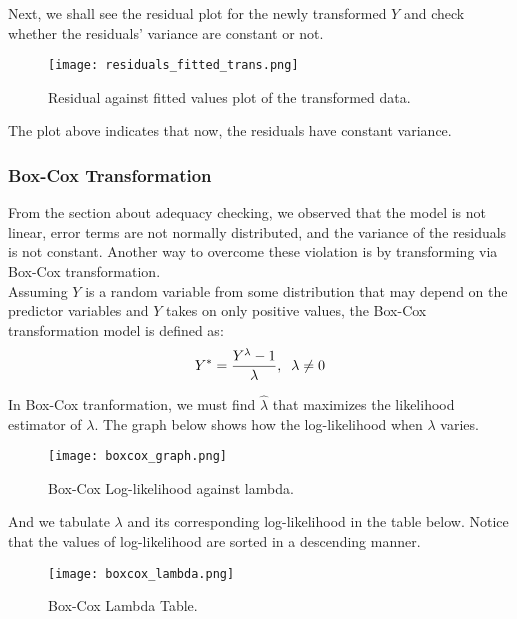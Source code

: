 \documentclass[english]{article}
\begin{document}
Next, we shall see the residual plot for the newly transformed $Y$ and check whether the residuals' variance are constant or not.

\begin{figure}[H]
	\begin{centering}
  		\texttt{[image: residuals\_fitted\_trans.png]}
  		\caption{Residual against fitted values plot of the transformed data.\label{figure10}
}
	\end{centering}
\end{figure}

The plot above indicates that now, the residuals have constant variance.

\subsubsection{Box-Cox Transformation}
From the section about adequacy checking, we observed that the model is not linear, error terms are not normally distributed, and the variance of the residuals is not constant. Another way to overcome these violation is by transforming via Box-Cox transformation. \\ 

Assuming $Y$ is a random variable from some distribution that may depend on the predictor variables and $Y$ takes on only positive values, the Box-Cox transformation model is defined as: 
$$Y^* = \frac{Y^\lambda-1}{\lambda},\thickspace \thickspace \lambda \neq 0$$

In Box-Cox tranformation, we must find $\hat{\lambda}$ that maximizes the likelihood estimator of $\lambda$. The graph below shows how the log-likelihood when $\lambda$ varies. 

\begin{figure}[H]
	\begin{centering}
  		\texttt{[image: boxcox\_graph.png]}
  		\caption{Box-Cox Log-likelihood against lambda.\label{boxcox}
}
	\end{centering}
\end{figure}

And we tabulate $\lambda$ and its corresponding log-likelihood in the table below. Notice that the values of log-likelihood are sorted in a descending manner. 

\begin{figure}[H]
	\begin{centering}
  		\texttt{[image: boxcox\_lambda.png]}
  		\caption{Box-Cox Lambda Table.\label{boxcox_lambda}
}
	\end{centering}
\end{figure}
\end{document}
